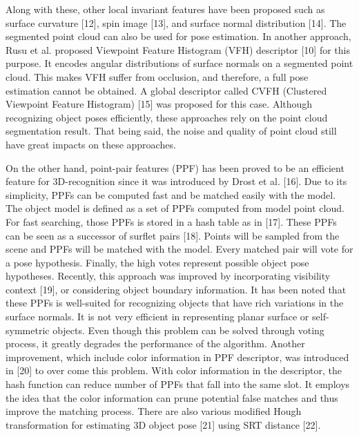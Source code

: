 \documentclass[10]{article}
\begin{document}
 Along with these, other local invariant features have been proposed such as surface curvature [12], spin image [13], and surface normal distribution [14]. The segmented point cloud can also be used for pose estimation. In another approach, Rusu et al. proposed Viewpoint Feature Histogram (VFH) descriptor [10] for this purpose. It encodes angular distributions of surface normals on a segmented point cloud. This makes VFH suffer from occlusion, and therefore, a full pose estimation cannot be obtained. A global descriptor called CVFH (Clustered Viewpoint Feature Histogram) [15] was proposed for this case. Although recognizing object poses efficiently, these approaches rely on the point cloud segmentation result. That being said, the noise and quality of point cloud still have great impacts on these approaches.

On the other hand, point-pair features (PPF) has been proved to be an efficient feature for 3D-recognition since it was introduced by Drost et al. [16]. Due to its simplicity, PPFs can be computed fast and be matched easily with the model. The object model is defined as a set of PPFs computed from model point cloud. For fast searching, those PPFs is stored in a hash table as in [17]. These PPFs can be seen as a successor of surflet pairs [18]. Points will be sampled from the scene and PPFs will be matched with the model. Every matched pair will vote for a pose hypothesis. Finally, the high votes represent possible object pose hypotheses. Recently, this approach was improved by incorporating visibility context [19], or considering object boundary information. It has been noted that these PPFs is well-suited for recognizing objects that have rich variations in the surface normals. It is not very efficient in representing planar surface or self-symmetric objects. Even though this problem can be solved through voting process, it greatly degrades the performance of the algorithm. Another improvement, which include color information in PPF descriptor, was introduced in [20] to over come this problem. With color information in the descriptor, the hash function can reduce number of PPFs that fall into the same slot. It employs the idea that the color information can prune potential false matches and thus improve the matching process. There are also various modified Hough transformation for estimating 3D object pose [21] using SRT distance [22].
\end{document}
